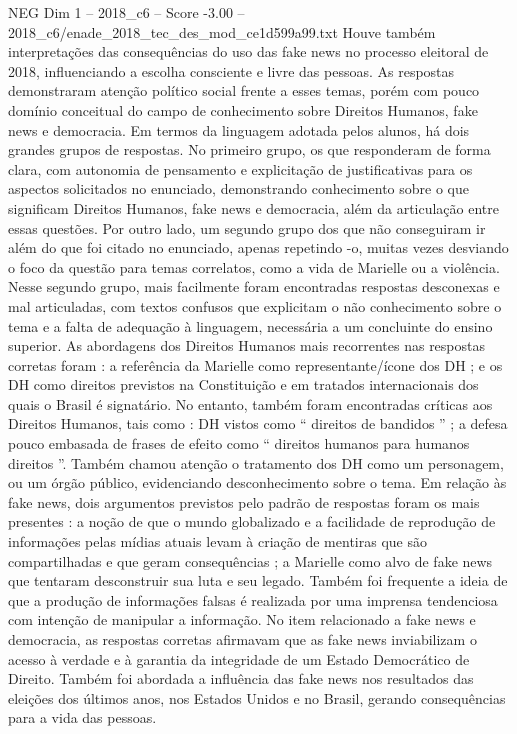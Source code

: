 \begin{textsample}{NEG Dim 1 – 2018\_c6 – Score -3.00 – 2018\_c6/enade\_2018\_tec\_des\_mod\_ce1d599a99.txt}
Houve também interpretações das consequências do uso das fake news no processo eleitoral de 2018, influenciando a escolha consciente e livre das pessoas.
As respostas demonstraram atenção político social frente a esses temas, porém com pouco domínio conceitual do campo de conhecimento sobre Direitos Humanos, fake news e democracia.
Em termos da linguagem adotada pelos alunos, há dois grandes grupos de respostas.
No primeiro grupo, os que responderam de forma clara, com autonomia de pensamento e explicitação de justificativas para os aspectos solicitados no enunciado, demonstrando conhecimento sobre o que significam Direitos Humanos, fake news e democracia, além da articulação entre essas questões.
Por outro lado, um segundo grupo dos que não conseguiram ir além do que foi citado no enunciado, apenas repetindo -o, muitas vezes desviando o foco da questão para temas correlatos, como a vida de Marielle ou a violência.
Nesse segundo grupo, mais facilmente foram encontradas respostas desconexas e mal articuladas, com textos confusos que explicitam o não conhecimento sobre o tema e a falta de adequação à linguagem, necessária a um concluinte do ensino superior.
As abordagens dos Direitos Humanos mais recorrentes nas respostas corretas foram : a referência da Marielle como representante/ícone dos DH ; e os DH como direitos previstos na Constituição e em tratados internacionais dos quais o Brasil é signatário.
No entanto, também foram encontradas críticas aos Direitos Humanos, tais como : DH vistos como “ direitos de bandidos ” ; a defesa pouco embasada de frases de efeito como “ direitos humanos para humanos direitos ”.
Também chamou atenção o tratamento dos DH como um personagem, ou um órgão público, evidenciando desconhecimento sobre o tema.
Em relação às fake news, dois argumentos previstos pelo padrão de respostas foram os mais presentes : a noção de que o mundo globalizado e a facilidade de reprodução de informações pelas mídias atuais levam à criação de mentiras que são compartilhadas e que geram consequências ; a Marielle como alvo de fake news que tentaram desconstruir sua luta e seu legado.
Também foi frequente a ideia de que a produção de informações falsas é realizada por uma imprensa tendenciosa com intenção de manipular a informação.
No item relacionado a fake news e democracia, as respostas corretas afirmavam que as fake news inviabilizam o acesso à verdade e à garantia da integridade de um Estado Democrático de Direito.
Também foi abordada a influência das fake news nos resultados das eleições dos últimos anos, nos Estados Unidos e no Brasil, gerando consequências para a vida das pessoas.

\end{textsample}

